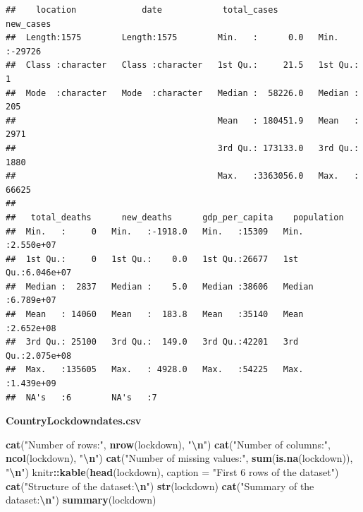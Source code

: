 \documentclass[
]{article}
\newenvironment{Shaded}{\begin{snugshade}}{\end{snugshade}}
\newcommand{\AttributeTok}[1]{\textcolor[rgb]{0.13,0.29,0.53}{#1}}
\newcommand{\FunctionTok}[1]{\textcolor[rgb]{0.13,0.29,0.53}{\textbf{#1}}}
\newcommand{\NormalTok}[1]{#1}
\newcommand{\SpecialCharTok}[1]{\textcolor[rgb]{0.81,0.36,0.00}{\textbf{#1}}}
\newcommand{\StringTok}[1]{\textcolor[rgb]{0.31,0.60,0.02}{#1}}
\begin{document}
\begin{verbatim}
##    location             date            total_cases          new_cases     
##  Length:1575        Length:1575        Min.   :      0.0   Min.   :-29726  
##  Class :character   Class :character   1st Qu.:     21.5   1st Qu.:     1  
##  Mode  :character   Mode  :character   Median :  58226.0   Median :   205  
##                                        Mean   : 180451.9   Mean   :  2971  
##                                        3rd Qu.: 173133.0   3rd Qu.:  1880  
##                                        Max.   :3363056.0   Max.   : 66625  
##                                                                            
##   total_deaths      new_deaths      gdp_per_capita    population       
##  Min.   :     0   Min.   :-1918.0   Min.   :15309   Min.   :2.550e+07  
##  1st Qu.:     0   1st Qu.:    0.0   1st Qu.:26677   1st Qu.:6.046e+07  
##  Median :  2837   Median :    5.0   Median :38606   Median :6.789e+07  
##  Mean   : 14060   Mean   :  183.8   Mean   :35140   Mean   :2.652e+08  
##  3rd Qu.: 25100   3rd Qu.:  149.0   3rd Qu.:42201   3rd Qu.:2.075e+08  
##  Max.   :135605   Max.   : 4928.0   Max.   :54225   Max.   :1.439e+09  
##  NA's   :6        NA's   :7
\end{verbatim}

\vspace{1cm}

\textbf{CountryLockdowndates.csv}

\begin{Shaded}
\begin{Highlighting}[]
\FunctionTok{cat}\NormalTok{(}\StringTok{"Number of rows:"}\NormalTok{, }\FunctionTok{nrow}\NormalTok{(lockdown), }\StringTok{"}\SpecialCharTok{\textbackslash{}n}\StringTok{"}\NormalTok{)}
\FunctionTok{cat}\NormalTok{(}\StringTok{"Number of columns:"}\NormalTok{, }\FunctionTok{ncol}\NormalTok{(lockdown), }\StringTok{"}\SpecialCharTok{\textbackslash{}n}\StringTok{"}\NormalTok{)}
\FunctionTok{cat}\NormalTok{(}\StringTok{"Number of missing values:"}\NormalTok{, }\FunctionTok{sum}\NormalTok{(}\FunctionTok{is.na}\NormalTok{(lockdown)), }\StringTok{"}\SpecialCharTok{\textbackslash{}n}\StringTok{"}\NormalTok{)}
\NormalTok{knitr}\SpecialCharTok{::}\FunctionTok{kable}\NormalTok{(}\FunctionTok{head}\NormalTok{(lockdown), }\AttributeTok{caption =} \StringTok{"First 6 rows of the dataset"}\NormalTok{)}
\FunctionTok{cat}\NormalTok{(}\StringTok{"Structure of the dataset:}\SpecialCharTok{\textbackslash{}n}\StringTok{"}\NormalTok{)}
\FunctionTok{str}\NormalTok{(lockdown)}
\FunctionTok{cat}\NormalTok{(}\StringTok{"Summary of the dataset:}\SpecialCharTok{\textbackslash{}n}\StringTok{"}\NormalTok{)}
\FunctionTok{summary}\NormalTok{(lockdown)}
\end{Highlighting}
\end{Shaded}
\end{document}
